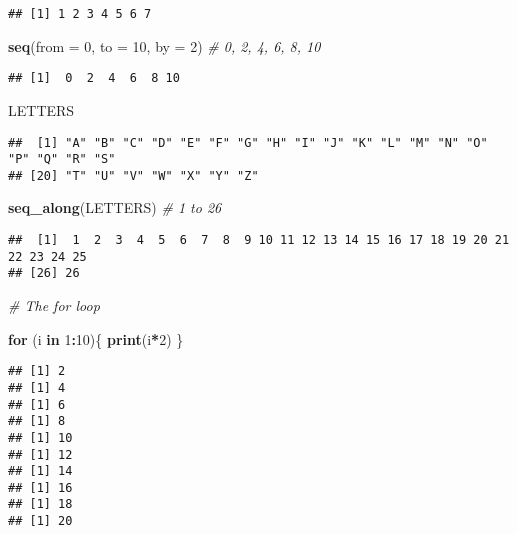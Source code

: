 \documentclass[
]{article}
\newenvironment{Shaded}{\begin{snugshade}}{\end{snugshade}}
\newcommand{\AttributeTok}[1]{\textcolor[rgb]{0.13,0.29,0.53}{#1}}
\newcommand{\CommentTok}[1]{\textcolor[rgb]{0.56,0.35,0.01}{\textit{#1}}}
\newcommand{\ControlFlowTok}[1]{\textcolor[rgb]{0.13,0.29,0.53}{\textbf{#1}}}
\newcommand{\DecValTok}[1]{\textcolor[rgb]{0.00,0.00,0.81}{#1}}
\newcommand{\FunctionTok}[1]{\textcolor[rgb]{0.13,0.29,0.53}{\textbf{#1}}}
\newcommand{\NormalTok}[1]{#1}
\newcommand{\SpecialCharTok}[1]{\textcolor[rgb]{0.81,0.36,0.00}{\textbf{#1}}}
\begin{document}
\begin{verbatim}
## [1] 1 2 3 4 5 6 7
\end{verbatim}

\begin{Shaded}
\begin{Highlighting}[]
\FunctionTok{seq}\NormalTok{(}\AttributeTok{from =} \DecValTok{0}\NormalTok{, }\AttributeTok{to =} \DecValTok{10}\NormalTok{, }\AttributeTok{by =} \DecValTok{2}\NormalTok{) }\CommentTok{\# 0, 2, 4, 6, 8, 10}
\end{Highlighting}
\end{Shaded}

\begin{verbatim}
## [1]  0  2  4  6  8 10
\end{verbatim}

\begin{Shaded}
\begin{Highlighting}[]
\NormalTok{LETTERS}
\end{Highlighting}
\end{Shaded}

\begin{verbatim}
##  [1] "A" "B" "C" "D" "E" "F" "G" "H" "I" "J" "K" "L" "M" "N" "O" "P" "Q" "R" "S"
## [20] "T" "U" "V" "W" "X" "Y" "Z"
\end{verbatim}

\begin{Shaded}
\begin{Highlighting}[]
\FunctionTok{seq\_along}\NormalTok{(LETTERS) }\CommentTok{\# 1 to 26}
\end{Highlighting}
\end{Shaded}

\begin{verbatim}
##  [1]  1  2  3  4  5  6  7  8  9 10 11 12 13 14 15 16 17 18 19 20 21 22 23 24 25
## [26] 26
\end{verbatim}

\begin{Shaded}
\begin{Highlighting}[]
\CommentTok{\# The for loop}

\ControlFlowTok{for}\NormalTok{ (i }\ControlFlowTok{in} \DecValTok{1}\SpecialCharTok{:}\DecValTok{10}\NormalTok{)\{}
  \FunctionTok{print}\NormalTok{(i}\SpecialCharTok{*}\DecValTok{2}\NormalTok{)}
\NormalTok{\}}
\end{Highlighting}
\end{Shaded}

\begin{verbatim}
## [1] 2
## [1] 4
## [1] 6
## [1] 8
## [1] 10
## [1] 12
## [1] 14
## [1] 16
## [1] 18
## [1] 20
\end{verbatim}
\end{document}
